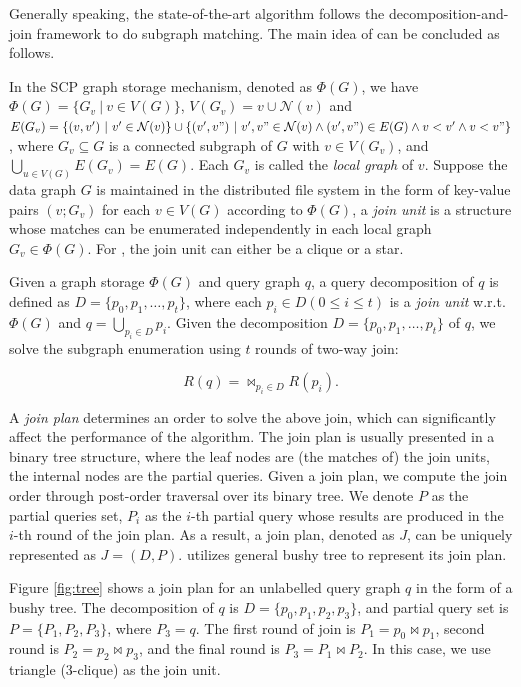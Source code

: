  Generally speaking, the state-of-the-art algorithm \cliquejoin follows the decomposition-and-join framework to do subgraph matching. The main idea of \cliquejoin can be concluded as follows. 

 In the SCP graph storage mechanism, denoted as $\Phi(G)$, we have $\Phi(G)=\{G_v\ |\ v\in V(G)\}$, $V(G_v)={v}\cup\mathcal{N}(v)$ and $E(G_v)=\{(v,v')\ |\ v'\in\mathcal{N}(v)\}\cup\{(v',v")\ |\ v',v"\in\mathcal{N}(v)\wedge(v',v")\in E(G)\wedge v<v'\wedge v<v"\}$, where $G_v\subseteq G$ is a connected subgraph of $G$ with $v\in V(G_v)$, and $\bigcup_{u\in V(G)}E(G_v)=E(G)$. Each $G_v$ is called the \textit{local graph} of $v$. Suppose the data graph $G$ is maintained in the distributed file system in the form of key-value pairs $(v;G_v)$ for each $v\in V(G)$ according to $\Phi(G)$, a \textit{join unit} is a structure whose matches can be enumerated independently in each local graph $G_v\in \Phi(G)$. For \cliquejoin, the join unit can either be a clique or a star. 

 Given a graph storage $\Phi(G)$ and query graph $q$, a query decomposition of $q$ is defined as $D=\{p_0,p_1,\dots,p_t\}$, where each $p_i\in D(0\leq i\leq t)$ is a \textit{join unit} w.r.t. $\Phi(G)$ and $q = \bigcup_{p_i\in D}p_i$. Given the decomposition $D=\{p_0,p_1,\dots,p_t\}$ of $q$, we solve the subgraph enumeration using $t$ rounds of two-way join:

\begin{equation} \label{eq:1}
R(q) = \bowtie_{p_i\in D}R(p_i).
\end{equation}

 A \textit{join plan} determines an order to solve the above join, which can significantly affect the performance of the algorithm. The join plan is usually presented in a binary tree structure, where the leaf nodes are (the matches of) the join units, the internal nodes are the partial queries. Given a join plan, we compute the join order through post-order traversal \cite{postorder} over its binary tree. We denote $P$ as the partial queries set, $P_i$ as the $i$-th partial query whose results are produced in the $i$-th round of the join plan. As a result, a join plan, denoted as $J$, can be uniquely represented as $J = (D, P)$. \cliquejoin utilizes general bushy tree \cite{tree} to represent its join plan. \\

\begin{example}
Figure \ref{fig:tree} shows a join plan for an unlabelled query graph $q$ in the form of a bushy tree. The decomposition of $q$ is $D=\{p_0, p_1, p_2, p_3\}$, and partial query set is $P=\{P_1, P_2, P_3\}$, where $P_3=q$. The first round of join is $P_1 = p_0 \Join p_1$, second round is $P_2=p_2 \Join p_3$, and the final round is $P_3 = P_1 \Join P_2$. In this case, we use triangle ($3$-clique) as the join unit.
\end{example}

